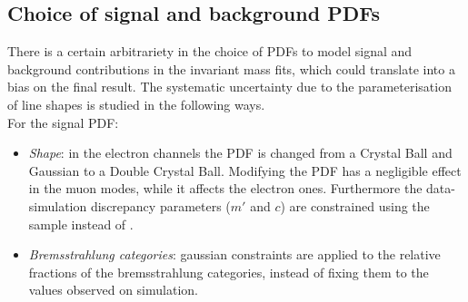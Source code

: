 \begin{table}[t!]
\begin{center}
\end{center}
\end{table}


\subsection{Choice of signal and background PDFs}

There is a certain arbitrariety in the choice of PDFs to model signal and background contributions in the
invariant mass fits, which could translate into a bias on the final result. The systematic uncertainty due to the
parameterisation of line shapes is studied in the following ways.
\\

For the signal PDF:
%
\begin{itemize}

\item \textit{Shape}: in the electron channels the PDF is changed from a Crystal Ball and Gaussian to a Double Crystal Ball.
Modifying the PDF has a negligible effect in the muon modes, while it affects the electron ones.
 Furthermore the data-simulation discrepancy parameters ($m'$ and $c$) are constrained using the
\BdToKstGee sample instead of \BdToKstJPsee.

\item \textit{Bremsstrahlung categories}: gaussian constraints are applied to the relative fractions of the bremsstrahlung
categories, instead of fixing them to the values observed on simulation.


\end{itemize}

